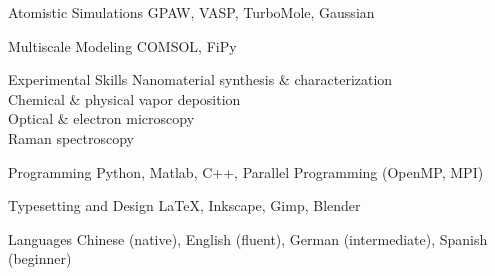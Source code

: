 

\begin{cvskills}
  \cvskill
  {Atomistic Simulations}
  {GPAW, VASP, TurboMole, Gaussian}

  \cvskill
  {Multiscale Modeling}
  {COMSOL, FiPy}

  \cvskill
  {Experimental Skills}
  {
    Nanomaterial synthesis \& characterization\\
    Chemical \& physical vapor deposition \\
    Optical \& electron microscopy \\
    Raman spectroscopy
  }

  \cvskill
  {Programming}
  {Python, Matlab, C++, Parallel Programming (OpenMP, MPI)}

  \cvskill
  {Typesetting and Design}
  {\LaTeX, Inkscape, Gimp, Blender}

  \cvskill
  {Languages}
  {Chinese (native), English (fluent),
    German (intermediate), Spanish (beginner)}
\end{cvskills}
